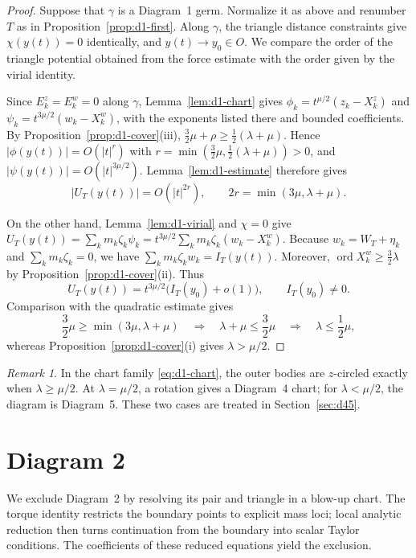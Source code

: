 \documentclass[Threeside,11pt]{article}
\theoremstyle{definition}
\theoremstyle{remark}
\newtheorem{remark}[theorem]{Remark}
\numberwithin{equation}{section}
\theoremstyle{remark}
\newcommand{\ord}{\operatorname{ord}}
\begin{document}
\begin{proof}
{Suppose that $\gamma$ is a Diagram~1 germ.  Normalize it as above and
renumber $T$ as in Proposition~\ref{prop:d1-first}.  Along $\gamma$, the triangle distance constraints give $\chi(y(t))=0$
identically, and $y(t)\to y_0\in O$.  We compare the order of the triangle potential obtained
from the force estimate with the order given by the virial identity.

Since $E^z_k=E^w_k=0$ along $\gamma$, Lemma~\ref{lem:d1-chart} gives
$\phi_k=t^{\mu/2}(z_k-X^z_k)$ and $\psi_k=t^{3\mu/2}(w_k-X^w_k)$, with the exponents listed
there and bounded coefficients.  By Proposition~\ref{prop:d1-cover}(iii),
$\frac32\mu+\rho\ge\frac12(\lambda+\mu)$.  Hence $|\phi(y(t))|=O(|t|^r)$ with
$r=\min(\frac32\mu,\frac12(\lambda+\mu))>0$, and $|\psi(y(t))|=O(|t|^{3\mu/2})$.
Lemma~\ref{lem:d1-estimate} therefore gives
\[
 |U_T(y(t))|=O(|t|^{2r}),\qquad
 2r=\min(3\mu,\lambda+\mu).
\]

On the other hand, Lemma~\ref{lem:d1-virial} and $\chi=0$ give
$U_T(y(t))=\sum_km_k\zeta_k\psi_k=t^{3\mu/2}\sum_km_k\zeta_k(w_k-X^w_k)$.
Because $w_k=W_T+\eta_k$ and $\sum_km_k\zeta_k=0$, we have
$\sum_km_k\zeta_kw_k=I_T(y(t))$.  Moreover,
$\ord X^w_k\ge\frac32\lambda$ by Proposition~\ref{prop:d1-cover}(ii).  Thus
\[
 U_T(y(t))=t^{3\mu/2}\bigl(I_T(y_0)+o(1)\bigr),\qquad I_T(y_0)\ne0.
\]
Comparison with the quadratic estimate gives
\[
 \frac32\mu\ge\min(3\mu,\lambda+\mu)
 \quad\Longrightarrow\quad
 \lambda+\mu\le\frac32\mu
 \quad\Longrightarrow\quad
 \lambda\le\frac12\mu,
\]
whereas Proposition~\ref{prop:d1-cover}(i) gives $\lambda>\mu/2$.}
\end{proof}

\begin{remark}\label{rem:d1-wall}
{In the chart family \eqref{eq:d1-chart}, the outer bodies are $z$-circled
exactly when $\lambda\ge\mu/2$. At $\lambda=\mu/2$, a rotation gives a Diagram~4 chart;
for $\lambda<\mu/2$, the diagram is Diagram~5. These two cases are treated in
Section~\ref{sec:d45}.}
\end{remark}




\section{Diagram 2}\label{sec:d2}

We exclude Diagram~2 by resolving its pair and triangle in a blow-up chart.
The torque identity restricts the boundary points to explicit mass loci; local
analytic reduction then turns continuation from the boundary into scalar Taylor
conditions. The coefficients of these reduced equations yield the exclusion.
\end{document}
